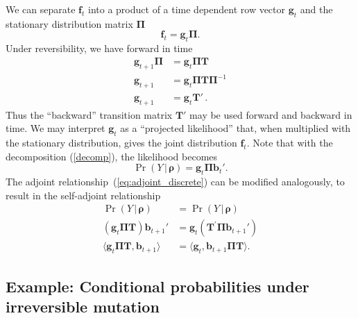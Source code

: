 \documentclass[preprint]{elsarticle}
\newcommand{\bs}[1]{\ensuremath{\boldsymbol{#1}}}
\newcommand\given{{\,|\,}}
\newcommand\x[1]{\ensuremath{X_{#1}}}
\newcommand\y{\ensuremath{Y}}
\newcommand\fv[1]{\ensuremath{\mathbf{f}_{#1}}}
\newcommand\bv[1]{\ensuremath{\mathbf{b}_{#1}}}
\newcommand\gv[1]{\ensuremath{\mathbf{g}_{#1}}}
\begin{document}
We can separate $\fv{t}$ into a product of a time dependent row vector $\gv{t}$ and the stationary distribution matrix $\mathbf{\Pi}$
\begin{equation}\label{decomp}
\fv{t}=\gv{t}\mathbf{\Pi}.
\end{equation}
Under reversibility, we have forward in time
\begin{equation}
\begin{split}
\gv{t+1}\mathbf{\Pi} &=\gv{t}\mathbf{\Pi}\mathbf{T}\\
\gv{t+1}             &=\gv{t}\mathbf{\Pi}\mathbf{T}\mathbf{\Pi}^{-1}\\
\gv{t+1}             &=\gv{t}\mathbf{T}'\,.
\end{split}
\end{equation}
Thus the ``backward'' transition matrix $\mathbf{T}'$ may be used forward and backward in time. We may interpret $\gv{t}$
as a ``projected likelihood'' that, when multiplied with the stationary distribution, gives the joint distribution $\fv{t}$. Note that with the decomposition (\ref{decomp}), the likelihood becomes
\begin{equation}
\Pr(\y \given \bs{\rho}) = \gv{t} \mathbf{\Pi} \bv{t}'.
\end{equation}
The adjoint relationship~(\ref{eq:adjoint_discrete}) can be modified analogously, to result in the self-adjoint relationship
\begin{equation}\label{eq:adjoint_discrete_2}
\begin{split}
\Pr(\y \given \bs{\rho})                              & = \Pr(\y \given \bs{\rho})                    \\
(\gv{t}\mathbf{\Pi} \mathbf{T}) \bv{t+1}'             & = \gv{t}(\mathbf{T}^{'}\mathbf{\Pi}\bv{t+1}') \\
\langle \gv{t}\mathbf{\Pi}\mathbf{T},\bv{t+1}\rangle  & = \langle \gv{t},\bv{t+1}\mathbf{\Pi}\mathbf{T} \rangle.
\end{split}
\end{equation}

\subsection{Example: Conditional probabilities under irreversible mutation}\label{section:irreversible}
\end{document}
